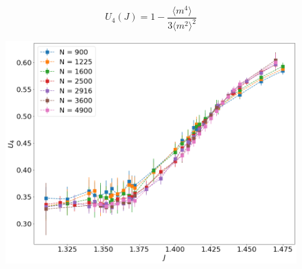 \documentclass{beamer}
\begin{document}
\begin{frame}
\begin{minipage}{0.48\linewidth}
	\end{minipage}%
	\hfill
	\begin{minipage}{0.48\linewidth}
		\ \begin{equation*}
		\label{binderqum}
		U_4 (J) = 1 - \frac{ \langle m^4 \rangle}{3 \langle m^2 \rangle^2  }
		\end{equation*}
		\begin{figure}[h]
			\centering
			\includegraphics[scale=0.2022]{bindercumulants_longchains.png} 
			\label{ph}
		\end{figure}
	\end{minipage}
\end{frame}
\end{document}

